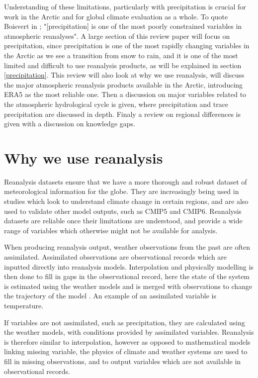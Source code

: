 \documentclass[12pt, oneside]{article}
\begin{document}
Understanding of these limitations, particularly with precipitation is crucial for work in the Arctic and for global climate evaluation as a whole. To quote Boisvert in \cite{boisvert2018intercomparison}; "[precipitation] is one of the most poorly constrained variables in atmospheric reanalyses". A large section of this review paper will focus on precipitation, since precipitation is one of the most rapidly changing variables in the Arctic as we see a transition from snow to rain, and it is one of the most limited and difficult to use reanalysis products, as will be explained in section \ref{precipitation}. This review will also look at why we use reanalysis, will discuss the major atmospheric reanalysis products available in the Arctic, introducing ERA5 as the most reliable one. Then a discussion on major variables related to the atmospheric hydrological cycle is given, where precipitation and trace precipitation are discussed in depth. Finaly a review on regional differences is given with a discussion on knowledge gaps. 


\section{Why we use reanalysis}
Reanalysis datasets ensure that we have a more thorough and robust dataset of meteorological information for the globe. They are increasingly being used in studies which look to understand climate change in certain regions, and are also used to validate other model outputs, such as CMIP5 and CMIP6. Reanalysis datasets are reliable once their limitations are understood, and provide a wide range of variables which otherwise might not be available for analysis. 

When producing reanalysis output, weather observations from the past are often assimilated. Assimilated observations are observational records which are inputted directly into reanalysis models. Interpolation and physically modelling is then done to fill in gaps in the observational record, here the state of the system is estimated using the weather models and is merged with observations to change the trajectory of the model \cite{fletcher2022data}. An example of an assimilated variable is temperature. 

If variables are not assimilated, such as precipitation, they are calculated using the weather models, with conditions provided by assimilated variables. Reanalysis is therefore similar to interpolation, however as opposed to mathematical models linking missing variable, the physics of climate and weather systems are used to fill in missing observations, and to output variables which are not available in observational records. 
\end{document}
